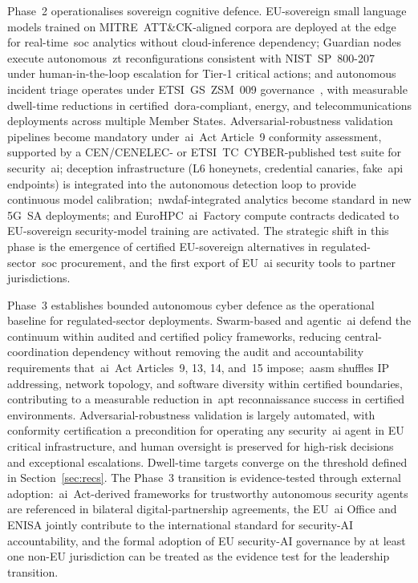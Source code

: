\documentclass{ieeeaccess}
\begin{document}
Phase~2 operationalises sovereign cognitive defence. EU-sovereign small language models trained on MITRE~ATT\&CK-aligned corpora are deployed at the edge for real-time~\gls{soc} analytics without cloud-inference dependency; Guardian nodes execute autonomous~\gls{zt} reconfigurations consistent with NIST~SP~800-207~\cite{rose2020zta} under human-in-the-loop escalation for Tier-1 critical actions; and autonomous incident triage operates under ETSI~GS~ZSM~009 governance~\cite{etsizsm}, with measurable dwell-time reductions in certified~\gls{dora}-compliant, energy, and telecommunications deployments across multiple Member States. Adversarial-robustness validation pipelines become mandatory under~\gls{ai}~Act Article~9 conformity assessment, supported by a CEN/CENELEC- or ETSI~TC~CYBER-published test suite for security~\gls{ai}; deception infrastructure (L6 honeynets, credential canaries, fake~\gls{api} endpoints) is integrated into the autonomous detection loop to provide continuous model calibration;~\gls{nwdaf}-integrated analytics become standard in new 5G~SA deployments; and EuroHPC~\gls{ai}~Factory compute contracts dedicated to EU-sovereign security-model training are activated. The strategic shift in this phase is the emergence of certified EU-sovereign alternatives in regulated-sector~\gls{soc} procurement, and the first export of EU~\gls{ai} security tools to partner jurisdictions.

Phase~3 establishes bounded autonomous cyber defence as the operational baseline for regulated-sector deployments. Swarm-based and agentic~\gls{ai} defend the continuum within audited and certified policy frameworks, reducing central-coordination dependency without removing the audit and accountability requirements that~\gls{ai}~Act Articles~9, 13, 14, and~15 impose;~\gls{aasm} shuffles IP addressing, network topology, and software diversity within certified boundaries, contributing to a measurable reduction in~\gls{apt} reconnaissance success in certified environments. Adversarial-robustness validation is largely automated, with conformity certification a precondition for operating any security~\gls{ai} agent in EU critical infrastructure, and human oversight is preserved for high-risk decisions and exceptional escalations. Dwell-time targets converge on the threshold defined in Section~\ref{sec:recs}. The Phase~3 transition is evidence-tested through external adoption:~\gls{ai}~Act-derived frameworks for trustworthy autonomous security agents are referenced in bilateral digital-partnership agreements, the EU~\gls{ai} Office and ENISA jointly contribute to the international standard for security-AI accountability, and the formal adoption of EU security-AI governance by at least one non-EU jurisdiction can be treated as the evidence test for the leadership transition.
\end{document}

